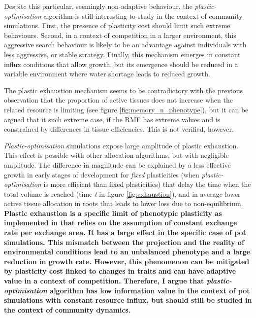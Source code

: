 Despite this particular, seemingly non-adaptive behaviour, the \textit{plastic-optimisation} algorithm is still interesting to study in the context of community simulations. First, the presence of plasticity cost should limit such extreme behaviours. Second, in a context of competition in a larger environment, this aggressive search behaviour is likely to be an advantage against individuals with less aggressive, or stable strategy. Finally, this mechanism emerges in constant influx conditions that allow growth, but its emergence should be reduced in a variable environment where water shortage leads to reduced growth.

The plastic exhaustion mechanism seems to be contradictory with the previous observation that the proportion of active tissues does not increase when the related resource is limiting (see figure \ref{fig:memory_n_phenotype}), but it can be argued that it such extreme case, if the RMF has extreme values and is constrained by differences in tissue efficiencies. This is not verified, however.

\textit{Plastic-optimisation} simulations expose large amplitude of plastic exhaustion. This effect is possible with other allocation algorithms, but with negligible amplitude. The difference in magnitude can be explained by a less effective growth in early stages of development for \textit{fixed} plasticities (when \textit{plastic-optimisation} is more efficient than fixed plasticities) that delay the time when the total volume is reached (time \textit{t} in figure \ref{fig:exhaustion}), and in average lower active tissue allocation in roots that leads to lower loss due to non-equilibrium.\\

\textbf{Plastic exhaustion is a specific limit of phenotypic plasticity as implemented in \model that relies on the assumption of constant exchange rate per exchange area. It has a large effect in the specific case of pot simulations. This mismatch between the projection and the reality of environmental conditions lead to an unbalanced phenotype and a large reduction in growth rate. However, this phenomenon can be mitigated by plasticity cost linked to changes in traits and can have adaptive value in a context of competition. Therefore, I argue that \textit{plastic-optimisation} algorithm  has low information value in the context of pot simulations with constant resource influx, but should still be studied in the context of community dynamics.}

%
%

